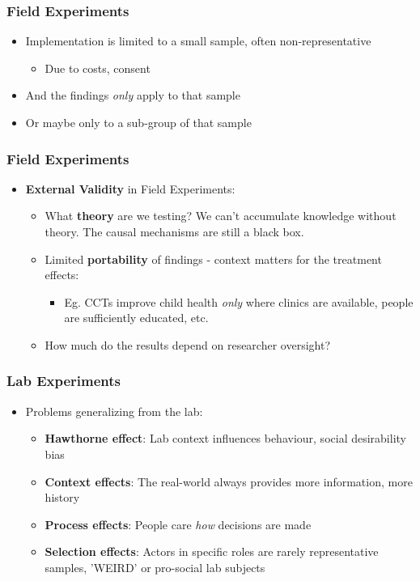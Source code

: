\documentclass[xcolor=x11names,compress]{beamer}\usepackage[]{graphicx}\usepackage[]{color}
\renewcommand{\(}{\begin{columns}}
\renewcommand{\)}{\end{columns}}
\newcommand{\<}[1]{\begin{column}{#1}}
\renewcommand{\>}{\end{column}}
\begin{document}
\begin{frame}
\frametitle{Field Experiments}
\begin{itemize}
\item Implementation is limited to a small sample, often non-representative
\pause
\begin{itemize}
\item Due to costs, consent
\pause
\end{itemize}
\item And the findings \textit{only} apply to that sample
\pause
\item Or maybe only to a sub-group of that sample
\end{itemize}
\end{frame}

\begin{frame}
\frametitle{Field Experiments}
\begin{itemize}
\item \textbf{External Validity} in Field Experiments:
\pause
\begin{itemize}
\item What \textbf{theory} are we testing? We can't accumulate knowledge without theory. The causal mechanisms are still a black box.
\pause
\item Limited \textbf{portability} of findings - context matters for the treatment effects:
\pause
\begin{itemize}
\item Eg. CCTs improve child health \textit{only} where clinics are available, people are sufficiently educated, etc.
\end{itemize}
\pause
\item How much do the results depend on researcher oversight?
\end{itemize}
\end{itemize}
\end{frame}

\begin{frame}
\frametitle{Lab Experiments}
\begin{itemize}
\item Problems generalizing from the lab:
\pause
\begin{itemize}
\item \textbf{Hawthorne effect}: Lab context influences behaviour, social desirability bias
\pause
\item \textbf{Context effects}: The real-world always provides more information, more history
\pause
\item \textbf{Process effects}: People care \textit{how} decisions are made
\pause
\item \textbf{Selection effects}: Actors in specific roles are rarely representative samples, 'WEIRD' or pro-social lab subjects
\end{itemize}
\end{itemize}
\end{frame}
\end{document}
